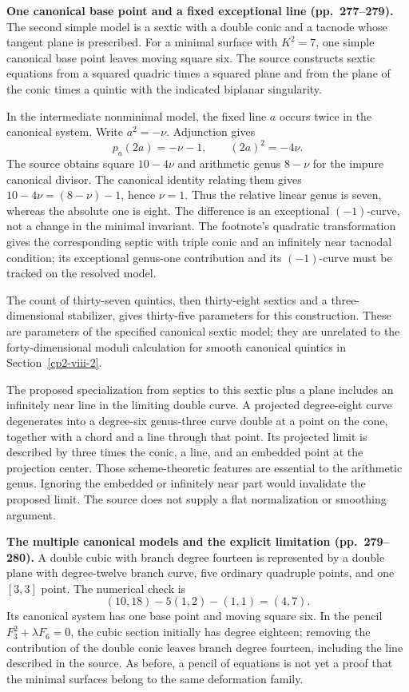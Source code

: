 \textbf{One canonical base point and a fixed exceptional line (pp.~277--279).}
The second simple model is a sextic with a double conic and a tacnode whose tangent plane is prescribed. For a minimal surface with \(K^2=7\), one simple canonical base point leaves moving square six. The source constructs sextic equations from a squared quadric times a squared plane and from the plane of the conic times a quintic with the indicated biplanar singularity.

In the intermediate nonminimal model, the fixed line \(a\) occurs twice in the canonical system. Write \(a^2=-\nu\). Adjunction gives
\[
p_a(2a)=-\nu-1,\qquad (2a)^2=-4\nu.
\]
The source obtains square \(10-4\nu\) and arithmetic genus \(8-\nu\) for the impure canonical divisor. The canonical identity relating them gives \(10-4\nu=(8-\nu)-1\), hence \(\nu=1\). Thus the relative linear genus is seven, whereas the absolute one is eight. The difference is an exceptional \((-1)\)-curve, not a change in the minimal invariant. The footnote's quadratic transformation gives the corresponding septic with triple conic and an infinitely near tacnodal condition; its exceptional genus-one contribution and its \((-1)\)-curve must be tracked on the resolved model.

The count of thirty-seven quintics, then thirty-eight sextics and a three-dimensional stabilizer, gives thirty-five parameters for this construction. These are parameters of the specified canonical sextic model; they are unrelated to the forty-dimensional moduli calculation for smooth canonical quintics in Section~\ref{cp2-viii-2}.

The proposed specialization from septics to this sextic plus a plane includes an infinitely near line in the limiting double curve. A projected degree-eight curve degenerates into a degree-six genus-three curve double at a point on the cone, together with a chord and a line through that point. Its projected limit is described by three times the conic, a line, and an embedded point at the projection center. Those scheme-theoretic features are essential to the arithmetic genus. Ignoring the embedded or infinitely near part would invalidate the proposed limit. The source does not supply a flat normalization or smoothing argument.

\textbf{The multiple canonical models and the explicit limitation (pp.~279--280).}
A double cubic with branch degree fourteen is represented by a double plane with degree-twelve branch curve, five ordinary quadruple points, and one \([3,3]\) point. The numerical check is
\[
(10,18)-5(1,2)-(1,1)=(4,7).
\]
Its canonical system has one base point and moving square six. In the pencil \(F_3^2+\lambda F_6=0\), the cubic section initially has degree eighteen; removing the contribution of the double conic leaves branch degree fourteen, including the line described in the source. As before, a pencil of equations is not yet a proof that the minimal surfaces belong to the same deformation family.

